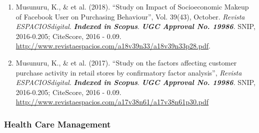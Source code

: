 \documentclass[10pt]{article}
\begin{document}
\begin{enumerate}
\item Musunuru, K., \& et al. (2018). \enquote{Study on Impact of Socioeconomic Makeup of Facebook User on Purchasing Behaviour}, Vol. 39(43), October.  \emph{Revista ESPACIOSdigital}. \emph{\textbf{Indexed in Scopus}}. \emph{\textbf{UGC Approval No. 19986}}. SNIP, 2016-0.205; CiteScore, 2016 - 0.09. \url{http://www.revistaespacios.com/a18v39n33/a18v39n33p28.pdf}. 

\item Musunuru, K., \& et al. (2017). \enquote{Study on the factors affecting customer purchase activity in retail stores by confirmatory factor analysis}, \emph{Revista ESPACIOSdigital}. \emph{\textbf{Indexed in Scopus}}. \emph{\textbf{UGC Approval No. 19986}}. SNIP, 2016-0.205; CiteScore, 2016 - 0.09. \url{http://www.revistaespacios.com/a17v38n61/a17v38n61p30.pdf}

\end{enumerate}

\subsubsection{Health Care Management}
\end{document}
